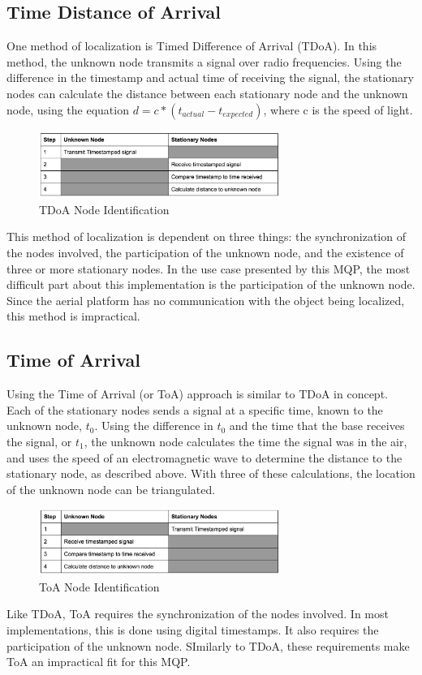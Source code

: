 \subsection{Time Distance of Arrival}
One method of localization is Timed Difference of Arrival (TDoA)\cite{local_conf}. In this method, the unknown node transmits a signal over radio frequencies. Using the difference in the timestamp and actual time of receiving the signal, the stationary nodes can calculate the distance between each stationary node and the unknown node, using the equation \( d = c*(t_{actual} - t_{expected}) \), where c is the speed of light.
\begin{figure}[ht]
\centering
\includegraphics[width=0.70\textwidth]{img/tdoa_node_table.png}
\caption{TDoA Node Identification}
\label{fig:tdoa_node_identification}
\end{figure}\par
This method of localization is dependent on three things: the synchronization of the nodes involved, the participation of the unknown node, and the existence of three or more stationary nodes. In the use case presented by this MQP, the most difficult part about this implementation is the participation of the unknown node. Since the aerial platform has no communication with the object being localized, this method is impractical.

\subsection{Time of Arrival}
Using the Time of Arrival (or ToA) approach is similar to TDoA in concept\cite{local_conf}. Each of the stationary nodes sends a signal at a specific time, known to the unknown node, $t_0$. Using the difference in $t_0$ and the time that the base receives the signal, or $t_1$, the unknown node calculates the time the signal was in the air, and uses the speed of an electromagnetic wave to determine the distance to the stationary node, as described above. With three of these calculations, the location of the unknown node can be triangulated.
\begin{figure}[ht]
\centering
\includegraphics[width=0.70\textwidth]{img/toa_node_table.png}
\caption{ToA Node Identification}
\label{fig:toa_node_identification}
\end{figure}\par
Like TDoA, ToA requires the synchronization of the nodes involved\cite{local_conf}. In most implementations, this is done using digital timestamps. It also requires the participation of the unknown node. SImilarly to TDoA, these requirements make ToA an impractical fit for this MQP.

